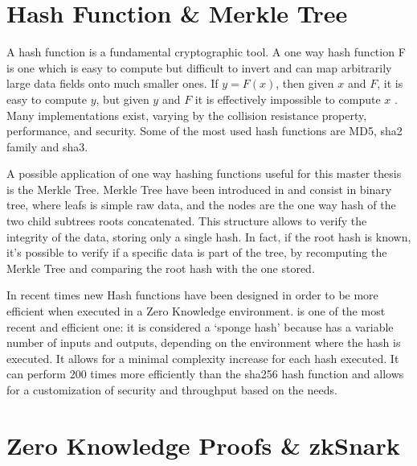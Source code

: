\section{Hash Function \& Merkle Tree}

A hash function is a fundamental cryptographic tool. A one way hash function F is one which is easy to compute but difficult to invert and can map arbitrarily large data fields onto much smaller ones. If $y = F(x)$, then given $x$ and $F$, it is easy to compute $y$, but given $y$ and $F$ it is effectively impossible to compute $x$ \cite{merkle_secrecy_1979}. Many implementations exist, varying by the collision resistance property, performance, and security. Some of the most used hash functions are MD5, sha2 family and sha3.

A possible application of one way hashing functions useful for this master thesis is the Merkle Tree. Merkle Tree have been introduced in \cite{merkle_secrecy_1979} and consist in binary tree, where leafs is simple raw data, and the nodes are the one way hash of the two child subtrees roots concatenated. This structure allows to verify the integrity of the data, storing only a single hash. In fact, if the root hash is known, it's possible to verify if a specific data is part of the tree, by recomputing the Merkle Tree and comparing the root hash with the one stored.

In recent times new Hash functions have been designed in order to be more efficient when executed in a Zero Knowledge environment. \cite{grassi_poseidon_2021} is one of the most recent and efficient one: it is considered a `sponge hash' because has a variable number of inputs and outputs, depending on the environment where the hash is executed. It allows for a minimal complexity increase for each hash executed. It can perform 200 times more efficiently than the sha256 hash function and allows for a customization of security and throughput based on the needs.

\section{Zero Knowledge Proofs \& zkSnark}

